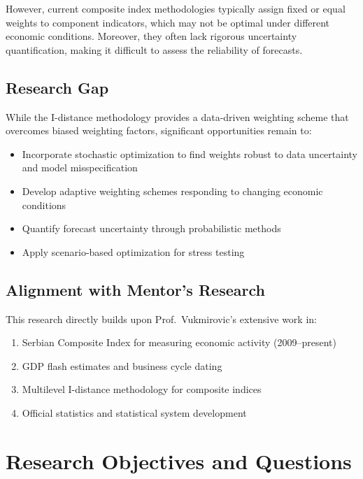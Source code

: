 \documentclass[12pt,a4paper]{article}
\begin{document}
However, current composite index methodologies typically assign fixed or equal weights to component indicators, which may not be optimal under different economic conditions. Moreover, they often lack rigorous uncertainty quantification, making it difficult to assess the reliability of forecasts.

\subsection{Research Gap}

While the I-distance methodology \citep{jovanovic2016idistance} provides a data-driven weighting scheme that overcomes biased weighting factors, significant opportunities remain to:

\begin{itemize}[leftmargin=*]
    \item Incorporate stochastic optimization to find weights robust to data uncertainty and model misspecification
    \item Develop adaptive weighting schemes responding to changing economic conditions
    \item Quantify forecast uncertainty through probabilistic methods
    \item Apply scenario-based optimization for stress testing
\end{itemize}

\subsection{Alignment with Mentor's Research}

This research directly builds upon Prof.\ Vukmirovic's extensive work in:
\begin{enumerate}[leftmargin=*]
    \item Serbian Composite Index for measuring economic activity (2009--present)
    \item GDP flash estimates and business cycle dating \citep{vukmirovic2015cycles}
    \item Multilevel I-distance methodology for composite indices \citep{jovanovic2016idistance}
    \item Official statistics and statistical system development
\end{enumerate}

\section{Research Objectives and Questions}
\end{document}

